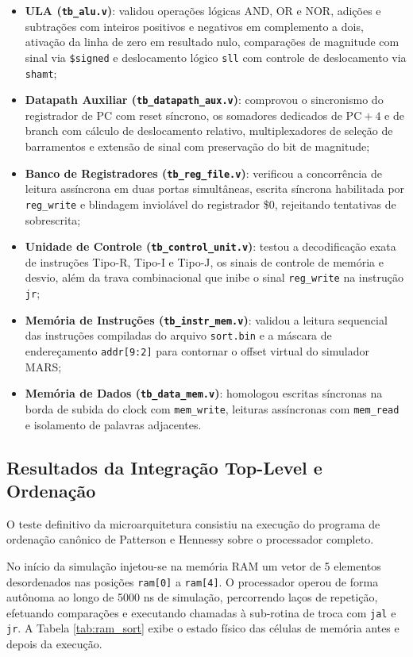 \begin{itemize}\setlength{\itemsep}{2pt}\setlength{\parskip}{0pt}
    \item \textbf{ULA (\texttt{tb\_alu.v})}: validou operações lógicas AND, OR e NOR, adições e subtrações com inteiros positivos e negativos em complemento a dois, ativação da linha de zero em resultado nulo, comparações de magnitude com sinal via \texttt{\$signed} e deslocamento lógico \texttt{sll} com controle de deslocamento via \texttt{shamt};
    \item \textbf{Datapath Auxiliar (\texttt{tb\_datapath\_aux.v})}: comprovou o sincronismo do registrador de PC com reset síncrono, os somadores dedicados de $\text{PC}+4$ e de branch com cálculo de deslocamento relativo, multiplexadores de seleção de barramentos e extensão de sinal com preservação do bit de magnitude;
    \item \textbf{Banco de Registradores (\texttt{tb\_reg\_file.v})}: verificou a concorrência de leitura assíncrona em duas portas simultâneas, escrita síncrona habilitada por \texttt{reg\_write} e blindagem inviolável do registrador \$0, rejeitando tentativas de sobrescrita;
    \item \textbf{Unidade de Controle (\texttt{tb\_control\_unit.v})}: testou a decodificação exata de instruções Tipo-R, Tipo-I e Tipo-J, os sinais de controle de memória e desvio, além da trava combinacional que inibe o sinal \texttt{reg\_write} na instrução \texttt{jr};
    \item \textbf{Memória de Instruções (\texttt{tb\_instr\_mem.v})}: validou a leitura sequencial das instruções compiladas do arquivo \texttt{sort.bin} e a máscara de endereçamento \texttt{addr[9:2]} para contornar o offset virtual do simulador MARS;
    \item \textbf{Memória de Dados (\texttt{tb\_data\_mem.v})}: homologou escritas síncronas na borda de subida do clock com \texttt{mem\_write}, leituras assíncronas com \texttt{mem\_read} e isolamento de palavras adjacentes.
\end{itemize}

\subsection{Resultados da Integração Top-Level e Ordenação}
O teste definitivo da microarquitetura consistiu na execução do programa de ordenação canônico de Patterson e Hennessy \cite{patterson_mips} sobre o processador completo.

No início da simulação injetou-se na memória RAM um vetor de 5 elementos desordenados nas posições \texttt{ram[0]} a \texttt{ram[4]}. O processador operou de forma autônoma ao longo de 5000 ns de simulação, percorrendo laços de repetição, efetuando comparações e executando chamadas à sub-rotina de troca com \texttt{jal} e \texttt{jr}. A Tabela \ref{tab:ram_sort} exibe o estado físico das células de memória antes e depois da execução.

